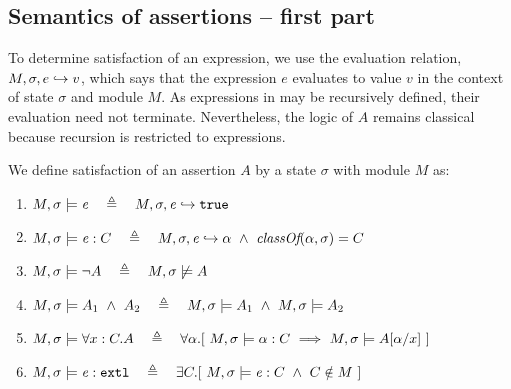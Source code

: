 \subsection{Semantics of assertions %
-- first part}
\label{sect:semantics:assert:standard}

To determine satisfaction of an expression, we    use the evaluation relation, $M, \sigma, e \hookrightarrow v$,
which says that the expression $e$ evaluates
to value $v$ in the context of state $\sigma$ and module $M$.
As expressions in \LangOO may be recursively defined, their evaluation 
need not   %
 terminate. Nevertheless, the logic of $A$ remains classical because recursion is restricted
to expressions. %


\begin{definition} 
\label{def:chainmail-semantics}
We define satisfaction of an assertion $A$ by a %
state $\sigma$ with 
 module $M$ as:
\begin{enumerate}
\item
\label{cExpr}
$\satisfiesA{M}{\sigma}{{\re}}\ \ \ \triangleq \ \ \   \eval{M}{\sigma}{{\re}}{\true}$
\item
\label{cClass}
$M , \sigma \models {{\mathit{e}}} : C\ \ \ \triangleq \ \ \   M, \sigma, {\mathit{e}} \hookrightarrow \alpha\   \wedge \ \textit{classOf}(\alpha, \sigma)= C$
\item
$\satisfiesA{M}{\sigma}{\neg A}\ \ \ \triangleq \ \ \   {M},{\sigma}\not\models{A}$
\item
$\satisfiesA{M}{\sigma}{A_1\ \wedge\ A_2}\ \ \ \triangleq \ \ \   \satisfiesA{M}{\sigma}{A_1} \   \wedge \ \satisfiesA{M}{\sigma}{A_2}$
\item
\label{quant1}
$\satisfiesA{M}{\sigma}{\all{x:C}{A}} \ \ \ \triangleq \ \ \   
\forall \alpha.[\   \satisfiesA {M}{\sigma} {\alpha:C}  \ \Longrightarrow   \ \satisfiesA{M}{\sigma} {A[\alpha/x]} \ ] $

\item
\label{cExternal}
$\satisfiesA{M}{\sigma}{\external{{\re}}} \ \ \ \triangleq \ \ \  \exists C.[\ \satisfiesA{M}{\sigma}{{{\re}} : C} \ \wedge \ C \notin M \ ]$
\end{enumerate}
\end{definition}

